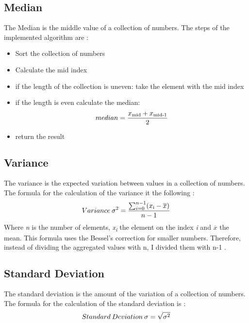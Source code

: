\documentclass[10pt, a4paper, twocolumn]{article} %
\begin{document}
\subsection{Median}
The Median is the middle value of a collection of numbers. The steps of the implemented algorithm are
\citep{medianCFI}: 
\begin{itemize}
	\item Sort the collection of numbers 
	\item Calculate the mid index 
	\item if the length of the collection is uneven: take the element with the mid index
	\item if the length is even calculate the median: 
	\[
	median = \frac{x\textsubscript{mid} + x\textsubscript{mid-1}} {2}
	\]
	\item return the result
\end{itemize}




\subsection{Variance}
The variance is the expected variation between values in a collection of numbers. 
The formula for the calculation of the variance it the following
\citep{varianceAndStandardDeviationStack}: 
\[
Variance\:\sigma\textsuperscript{2} = \frac{\sum_{i=0}^{n-1}(x\textsubscript{i} - \overline{x})}{n-1}
\]
Where \textit{n} is the number of elements, \textit{x\textsubscript{i}} the element on the index \textit{i} and \textit{$\overline{x}$} the mean. This formula uses the Bessel's correction for smaller numbers. Therefore, instead of dividing the aggregated values with n, I divided them with n-1 \citep{varianceAndStandardDeviationStack}. 



\subsection{Standard Deviation}
The standard deviation is the amount of the variation of a collection of numbers. 
The formula for the calculation of the standard deviation is
\citep{varianceAndStandardDeviationStack}: 
\[
Standard\:Deviation\:\sigma = \sqrt{\sigma\textsuperscript{2}}
\]
\end{document}

